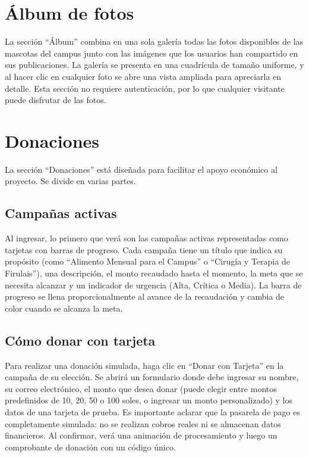 \documentclass[12pt,a4paper]{article}
\begin{document}
\section{Álbum de fotos}

La sección ``Álbum'' combina en una sola galería todas las fotos disponibles de las mascotas del campus junto con las imágenes que los usuarios han compartido en sus publicaciones. La galería se presenta en una cuadrícula de tamaño uniforme, y al hacer clic en cualquier foto se abre una vista ampliada para apreciarla en detalle. Esta sección no requiere autenticación, por lo que cualquier visitante puede disfrutar de las fotos.

\section{Donaciones}

La sección ``Donaciones'' está diseñada para facilitar el apoyo económico al proyecto. Se divide en varias partes.

\subsection{Campañas activas}

Al ingresar, lo primero que verá son las campañas activas representadas como tarjetas con barras de progreso. Cada campaña tiene un título que indica su propósito (como ``Alimento Mensual para el Campus'' o ``Cirugía y Terapia de Firulais''), una descripción, el monto recaudado hasta el momento, la meta que se necesita alcanzar y un indicador de urgencia (Alta, Crítica o Media). La barra de progreso se llena proporcionalmente al avance de la recaudación y cambia de color cuando se alcanza la meta.

\subsection{Cómo donar con tarjeta}

Para realizar una donación simulada, haga clic en ``Donar con Tarjeta'' en la campaña de su elección. Se abrirá un formulario donde debe ingresar su nombre, su correo electrónico, el monto que desea donar (puede elegir entre montos predefinidos de 10, 20, 50 o 100 soles, o ingresar un monto personalizado) y los datos de una tarjeta de prueba. Es importante aclarar que la pasarela de pago es completamente simulada: no se realizan cobros reales ni se almacenan datos financieros. Al confirmar, verá una animación de procesamiento y luego un comprobante de donación con un código único.
\end{document}
